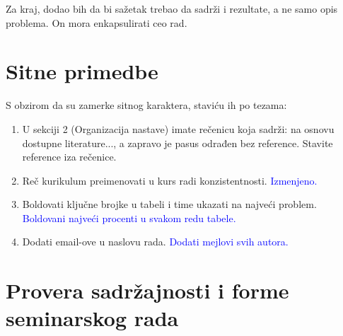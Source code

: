 \documentclass[a4paper]{report}
\newcommand{\odgovor}[1]{\textcolor{blue}{#1}}
\begin{document}
Za kraj, dodao bih da bi sažetak trebao da sadrži i rezultate, a ne samo opis problema. On mora enkapsulirati ceo rad.

\section{Sitne primedbe}
S obzirom da su zamerke sitnog karaktera, staviću ih po tezama:
\begin{enumerate}
\item U sekciji 2 (Organizacija nastave) imate rečenicu koja sadrži: na osnovu dostupne literature..., a zapravo je pasus odrađen bez reference. Stavite reference iza rečenice.
\item Reč kurikulum preimenovati u kurs radi konzistentnosti.
\odgovor{Izmenjeno.}
\item Boldovati ključne brojke u tabeli i time ukazati na najveći problem.
\odgovor{Boldovani najveći procenti u svakom redu tabele.}
\item Dodati email-ove u naslovu rada.
\odgovor{Dodati mejlovi svih autora.}
\end{enumerate}

\section{Provera sadržajnosti i forme seminarskog rada}
\end{document}

